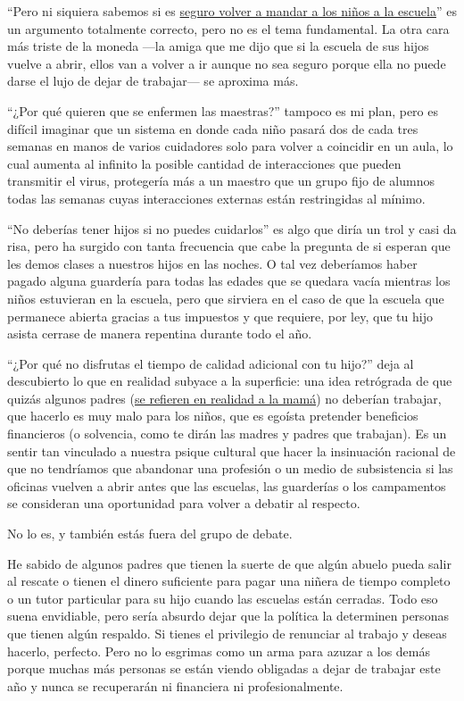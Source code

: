 ``Pero ni siquiera sabemos si es
\href{https://www.nytimes3xbfgragh.onion/2020/06/12/upshot/epidemiologists-decisions-children-school-coronavirus.html}{seguro
volver a mandar a los niños a la escuela}'' es un argumento totalmente
correcto, pero no es el tema fundamental. La otra cara más triste de la
moneda ---la amiga que me dijo que si la escuela de sus hijos vuelve a
abrir, ellos van a volver a ir aunque no sea seguro porque ella no puede
darse el lujo de dejar de trabajar--- se aproxima más.

``¿Por qué quieren que se enfermen las maestras?'' tampoco es mi plan,
pero es difícil imaginar que un sistema en donde cada niño pasará dos de
cada tres semanas en manos de varios cuidadores solo para volver a
coincidir en un aula, lo cual aumenta al infinito la posible cantidad de
interacciones que pueden transmitir el virus, protegería más a un
maestro que un grupo fijo de alumnos todas las semanas cuyas
interacciones externas están restringidas al mínimo.

``No deberías tener hijos si no puedes cuidarlos'' es algo que diría un
trol y casi da risa, pero ha surgido con tanta frecuencia que cabe la
pregunta de si esperan que les demos clases a nuestros hijos en las
noches. O tal vez deberíamos haber pagado alguna guardería para todas
las edades que se quedara vacía mientras los niños estuvieran en la
escuela, pero que sirviera en el caso de que la escuela que permanece
abierta gracias a tus impuestos y que requiere, por ley, que tu hijo
asista cerrase de manera repentina durante todo el año.

``¿Por qué no disfrutas el tiempo de calidad adicional con tu hijo?''
deja al descubierto lo que en realidad subyace a la superficie: una idea
retrógrada de que quizás algunos padres
(\href{https://www.nytimes3xbfgragh.onion/2020/06/03/business/economy/coronavirus-working-women.html}{se
refieren en realidad a la mamá}) no deberían trabajar, que hacerlo es
muy malo para los niños, que es egoísta pretender beneficios financieros
(o solvencia, como te dirán las madres y padres que trabajan). Es un
sentir tan vinculado a nuestra psique cultural que hacer la insinuación
racional de que no tendríamos que abandonar una profesión o un medio de
subsistencia si las oficinas vuelven a abrir antes que las escuelas, las
guarderías o los campamentos se consideran una oportunidad para volver a
debatir al respecto.

No lo es, y también estás fuera del grupo de debate.

He sabido de algunos padres que tienen la suerte de que algún abuelo
pueda salir al rescate o tienen el dinero suficiente para pagar una
niñera de tiempo completo o un tutor particular para su hijo cuando las
escuelas están cerradas. Todo eso suena envidiable, pero sería absurdo
dejar que la política la determinen personas que tienen algún respaldo.
Si tienes el privilegio de renunciar al trabajo y deseas hacerlo,
perfecto. Pero no lo esgrimas como un arma para azuzar a los demás
porque muchas más personas se están viendo obligadas a dejar de trabajar
este año y nunca se recuperarán ni financiera ni profesionalmente.

